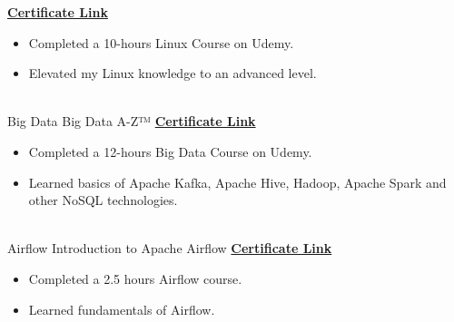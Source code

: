 \documentclass[letterpaper]{DS_class_file} %
\begin{document}
\begin{twenty}
		{\href{https://www.udemy.com/certificate/UC-74719d94-89af-44ba-ab2d-4299dd2ec3dd/}{\textbf{Certificate Link}}}
		{}
		{
			{\begin{itemize}
					\item Completed a 10-hours Linux Course on Udemy.
					\item Elevated my Linux knowledge to an advanced level.
			\end{itemize}}
		}
		\\
		\twentyitem
		{Big Data}
		{}
		{\hspace{0.3cm}Big Data A-Z™}
		{\href{https://www.udemy.com/certificate/UC-4a851250-cc99-4a9d-8f7c-d8a32ed0a832/}{\textbf{Certificate Link}}}
		{}
		{
			{\begin{itemize}
					\item Completed a 12-hours Big Data Course on Udemy.
					\item Learned basics of Apache Kafka, Apache Hive, Hadoop, Apache Spark and other NoSQL technologies.
			\end{itemize}}
		}
		\\
		\twentyitem
		{Airflow}
		{}
		{\hspace{0.3cm}Introduction to Apache Airflow}
		{\href{https://www.udemy.com/certificate/UC-634f3164-fcb1-4bdf-b5b0-909134dd3252/}{\textbf{Certificate Link}}}
		{}
		{
			{\begin{itemize}
					\item Completed a 2.5 hours Airflow course.
						\item Learned fundamentals of Airflow.
			\end{itemize}}
		}
		
	
		
	\end{twenty}
	
	
	
		
	
	
	
	
\end{document}
